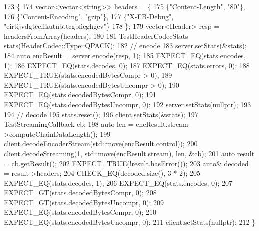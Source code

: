 \begin{DoxyCode}
173                                      \{
174   vector<vector<string>> headers = \{
175     \{\textcolor{stringliteral}{"Content-Length"}, \textcolor{stringliteral}{"80"}\},
176     \{\textcolor{stringliteral}{"Content-Encoding"}, \textcolor{stringliteral}{"gzip"}\},
177     \{\textcolor{stringliteral}{"X-FB-Debug"}, \textcolor{stringliteral}{"eirtijvdgtccffkutnbttcgbfieghgev"}\}
178   \};
179   vector<Header> resp = headersFromArray(headers);
180 
181   TestHeaderCodecStats stats(HeaderCodec::Type::QPACK);
182   \textcolor{comment}{// encode}
183   server.setStats(&stats);
184   \textcolor{keyword}{auto} encResult = server.encode(resp, 1);
185   EXPECT\_EQ(stats.encodes, 1);
186   EXPECT\_EQ(stats.decodes, 0);
187   EXPECT\_EQ(stats.errors, 0);
188   EXPECT\_TRUE(stats.encodedBytesCompr > 0);
189   EXPECT\_TRUE(stats.encodedBytesUncompr > 0);
190   EXPECT\_EQ(stats.decodedBytesCompr, 0);
191   EXPECT\_EQ(stats.decodedBytesUncompr, 0);
192   server.setStats(\textcolor{keyword}{nullptr});
193 
194   \textcolor{comment}{// decode}
195   stats.reset();
196   client.setStats(&stats);
197   TestStreamingCallback cb;
198   \textcolor{keyword}{auto} len = encResult.stream->computeChainDataLength();
199   client.decodeEncoderStream(std::move(encResult.control));
200   client.decodeStreaming(1, std::move(encResult.stream), len, &cb);
201   \textcolor{keyword}{auto} result = cb.getResult();
202   EXPECT\_TRUE(!result.hasError());
203   \textcolor{keyword}{auto}& decoded = result->headers;
204   CHECK\_EQ(decoded.size(), 3 * 2);
205   EXPECT\_EQ(stats.decodes, 1);
206   EXPECT\_EQ(stats.encodes, 0);
207   EXPECT\_GT(stats.decodedBytesCompr, 0);
208   EXPECT\_GT(stats.decodedBytesUncompr, 0);
209   EXPECT\_EQ(stats.encodedBytesCompr, 0);
210   EXPECT\_EQ(stats.encodedBytesUncompr, 0);
211   client.setStats(\textcolor{keyword}{nullptr});
212 \}
\end{DoxyCode}
